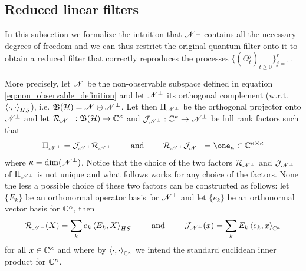 \documentclass[aihp,12pt]{imsart}
\begin{document}
\subsection{Reduced linear filters}

In this subsection we formalize the intuition that $\mathscr{N}^\perp$ contains all the necessary degrees of freedom and we can thus restrict the original quantum filter onto it to obtain a reduced filter that correctly reproduces the processes $\{(\Theta_t^j)_{t\geq0}\}_{j=1}^r$. 

More precisely, let $\mathscr{N}$ be the non-observable subspace defined in equation \eqref{eq:non_observable_definition} and let $\mathscr{N}^\perp$ its orthogonal complement (w.r.t. $\left< \cdot,\cdot \right>_{HS}$), i.e. $\mathfrak{B}(\mathcal{H})=\mathscr{N}\oplus\mathscr{N}^\perp$. 
Let then $\Pi_{\mathscr{N}^\perp}$ be the orthogonal projector onto $\mathscr{N}^\perp$ and let $\mathcal{R}_{\mathscr{N}^\perp}:\mathfrak{B}(\mathcal{H})\to\mathbb{C}^\kappa$ and $\mathcal{J}_{\mathscr{N}^\perp}:\mathbb{C}^\kappa\to\mathscr{N}^\perp$ be full rank factors such that \[\Pi_{\Ns^\perp}=\Jc_{\Ns^\perp}\Rc_{\Ns^\perp}\qquad\text{ and }\qquad\Rc_{\Ns^\perp}\Jc_{\Ns^\perp} = \one_\kappa\in\Cb^{\kappa \times \kappa}\] where $\kappa=\dim(\mathscr{N}^\perp)$. 
Notice that the choice of the two factors $\mathcal{R}_{\mathscr{N}^\perp}$ and $\mathcal{J}_{\mathscr{N}^\perp}$ of $\Pi_{\mathscr{N}^\perp}$ is not unique and what follows works for any choice of the factors. None the less a possible choice of these two factors can be constructed as follows: let $\{E_k\}$ be an orthonormal operator basis for $\mathscr{N}^\perp$ and let $\{e_k\}$ be an orthonormal vector basis for $\mathbb{C}^\kappa$, then \[\mathcal{R}_{\mathscr{N}^\perp}(X) = \sum_{k} e_k \left< E_k,X \right>_{HS}\qquad\text{ and }\qquad\mathcal{J}_{\mathscr{N}^\perp}(x) = \sum_k E_k \left< e_k,x \right>_{\mathbb{C}^\kappa}\] for all $x\in\mathbb{C}^\kappa$ and where by $\left< \cdot,\cdot \right>_{\mathbb{C}^\kappa}$ we intend the standard euclidean inner product for $\mathbb{C}^\kappa$.
\end{document}
